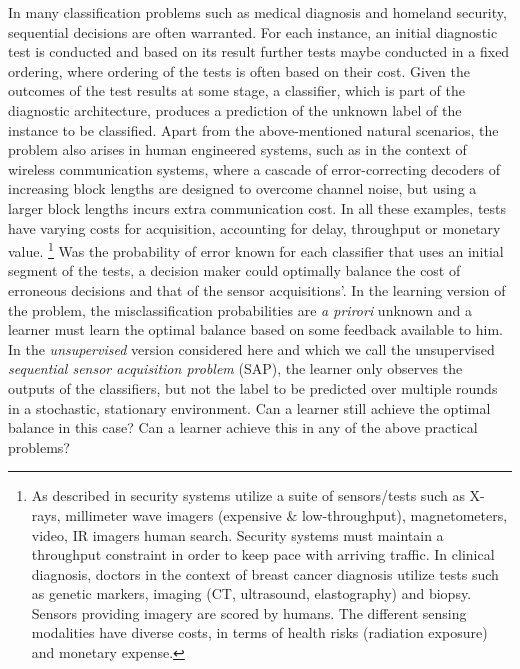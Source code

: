 In many classification problems  such as medical diagnosis  and  homeland  security,  sequential decisions  are  often  warranted.   For each  instance,  an initial diagnostic test  is conducted and based on its result further tests maybe conducted in a fixed ordering, where ordering of the tests is often based on their cost.
Given the outcomes of the test results at some stage,
a classifier, which is part of the diagnostic architecture,
produces a prediction of the unknown label of the instance to be classified.
Apart from the above-mentioned natural scenarios, 
the problem also arises in human engineered systems, such as in the context of wireless communication systems,
where a cascade of error-correcting decoders of increasing block lengths are designed to overcome channel noise, 
but using a larger block lengths incurs extra communication cost.
In all these examples, tests have varying  costs for  acquisition, accounting for delay,  throughput  or  monetary  value.%
\footnote{As described in \cite{ML13_MultistageClassifier_TrapezSaligramaCastanon} security systems utilize a suite of sensors/tests such as X-rays, millimeter wave imagers (expensive \& low-throughput), magnetometers, video, IR imagers human search.  Security systems  must  maintain  a  throughput  constraint  in  order to  keep  pace  with  arriving  traffic.   In  clinical  diagnosis, doctors  in the context of breast cancer diagnosis utilize tests such as genetic markers, imaging (CT, ultrasound, elastography) and biopsy. Sensors providing imagery are scored by humans. The different sensing  modalities  have  diverse  costs,  in  terms  of  health risks (radiation exposure) and monetary expense.}
Was the probability of error known for each classifier that uses an initial segment of the tests, 
a decision maker could optimally balance the cost of erroneous decisions and that of the sensor acquisitions'.
In the learning version of the problem, the misclassification probabilities are \emph{a prirori} unknown and a learner must learn the optimal balance based on some feedback available to him. 
In the \emph{unsupervised} version considered here
and which we call the unsupervised \emph{sequential sensor acquisition problem} (SAP),
the learner only observes the outputs of the classifiers, but not the label to be predicted over multiple rounds
in a stochastic, stationary environment.
Can a learner still achieve the optimal balance in this case? Can a learner achieve this in any of the above
practical problems?


